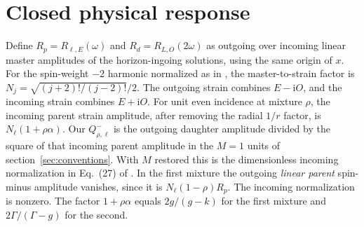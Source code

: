 \documentclass[11pt]{article}
\newcommand{\ii}{\mathrm{i}}
\begin{document}
\section{Closed physical response}
\label{sec:strain}

Define \(R_p=R_{\ell,E}(\omega)\) and \(R_d=R_{L,O}(2\omega)\) as outgoing over incoming linear master amplitudes of the horizon-ingoing solutions, using the same origin of \(x\).
For the spin-weight \(-2\) harmonic normalized as in \cite{bucciotti}, the master-to-strain factor is \(N_j=\sqrt{(j+2)!/(j-2)!}/2\).
The outgoing strain combines \(E-\ii O\), and the incoming strain combines \(E+\ii O\).
For unit even incidence at mixture \(\rho\), the incoming parent strain amplitude, after removing the radial \(1/r\) factor, is \(N_\ell(1+\rho\alpha)\).
Our \(Q^-_{\rho,\ell}\) is the outgoing daughter amplitude divided by the square of that incoming parent amplitude in the \(M=1\) units of section~\ref{sec:conventions}.
With \(M\) restored this is the dimensionless incoming normalization in Eq.~(27) of \cite{bucciotti}.
In the first mixture the outgoing \emph{linear parent} spin-minus amplitude vanishes, since it is \(N_\ell(1-\rho) R_p\).
The incoming normalization is nonzero. The factor \(1+\rho\alpha\) equals \(2g/(g-k)\) for the first mixture and \(2\Gamma/(\Gamma-g)\) for the second.
\end{document}
